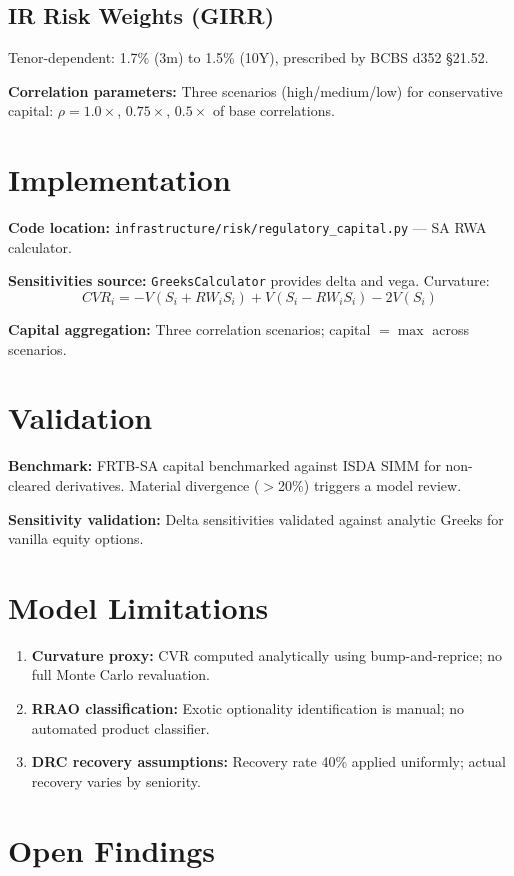 \documentclass{apex_mdd}
\begin{document}
\subsection{IR Risk Weights (GIRR)}
Tenor-dependent: 1.7\% (3m) to 1.5\% (10Y), prescribed by BCBS d352 §21.52.

\textbf{Correlation parameters:} Three scenarios (high/medium/low) for conservative capital: $\rho = 1.0\times$, $0.75\times$, $0.5\times$ of base correlations.

\section{Implementation}

\textbf{Code location:} \texttt{infrastructure/risk/regulatory\_capital.py} --- SA RWA calculator.

\textbf{Sensitivities source:} \texttt{GreeksCalculator} provides delta and vega. Curvature:
\[
  CVR_i = -V(S_i + RW_i S_i) + V(S_i - RW_i S_i) - 2V(S_i)
\]

\textbf{Capital aggregation:} Three correlation scenarios; capital $= \max$ across scenarios.

\section{Validation}

\textbf{Benchmark:} FRTB-SA capital benchmarked against ISDA SIMM for non-cleared derivatives. Material divergence ($>$20\%) triggers a model review.

\textbf{Sensitivity validation:} Delta sensitivities validated against analytic Greeks for vanilla equity options.

\section{Model Limitations}

\begin{enumerate}
  \item \textbf{Curvature proxy:} CVR computed analytically using bump-and-reprice; no full Monte Carlo revaluation.
  \item \textbf{RRAO classification:} Exotic optionality identification is manual; no automated product classifier.
  \item \textbf{DRC recovery assumptions:} Recovery rate 40\% applied uniformly; actual recovery varies by seniority.
\end{enumerate}

\section{Open Findings}

\begin{findings}
\end{findings}
\end{document}
